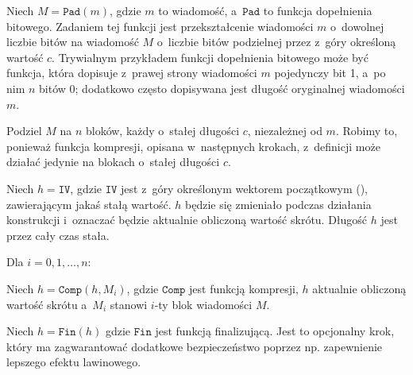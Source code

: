 \begin{myenumerate}

    \item Niech $M = \mathtt{Pad}(m)$, gdzie $m$ to wiadomość, a~$\mathtt{Pad}$
    to funkcja dopełnienia bitowego. Zadaniem tej funkcji jest przekształcenie
    wiadomości $m$ o~dowolnej liczbie bitów na wiadomość $M$ o~liczbie bitów
    podzielnej przez z~góry określoną wartość $c$. Trywialnym przykładem
    funkcji dopełnienia bitowego może być funkcja, która dopisuje z~prawej
    strony wiadomości $m$ pojedynczy bit 1, a~po nim $n$ bitów 0; dodatkowo
    często dopisywana jest długość oryginalnej wiadomości $m$.

    \item Podziel $M$ na $n$ bloków, każdy o~stałej długości $c$, niezależnej
    od $m$. Robimy to, ponieważ funkcja kompresji, opisana w~następnych
    krokach, z~definicji może działać jedynie na blokach o~stałej długości $c$.

    \item Niech $h = \mathtt{IV}$, gdzie $\mathtt{IV}$ jest z~góry określonym
    wektorem początkowym (), zawierającym jakaś stałą
    wartość. $h$ będzie się zmieniało podczas działania konstrukcji i~oznaczać
    będzie aktualnie obliczoną wartość skrótu. Długość $h$ jest przez cały czas
    stała.

    \item Dla $i = 0, 1, \ldots, n$:

    \begin{myenumerate}

        \item Niech $h=\mathtt{Comp}(h,M_i)$, gdzie $\mathtt{Comp}$ jest
        funkcją kompresji, $h$ aktualnie obliczoną wartość skrótu a~$M_i$
        stanowi $i$-ty blok wiadomości $M$.

    \end{myenumerate}

    \item Niech $h=\mathtt{Fin}(h)$ gdzie $\mathtt{Fin}$ jest funkcją
    finalizującą. Jest to opcjonalny krok, który ma zagwarantować dodatkowe
    bezpieczeństwo poprzez np. zapewnienie lepszego efektu lawinowego.

\end{myenumerate}

